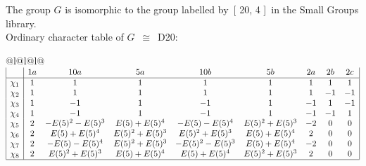 \documentclass[varwidth=\maxdimen,border=10]{standalone}
\begin{document}
The group $G$ is isomorphic to the group labelled by\ [ 20, 4 ]\ in the Small Groups library.\\
Ordinary character table of $G$\ $\cong$\ D20:\\
\begin{center}
\begin{tabular}{@{}l@{}l@{}l@{}}
\hline
\(\begin{array}{|l|cccccccc|}
  & 1a & 10a & 5a & 10b & 5b & 2a & 2b & 2c\\ \hline
\chi_{1} & 1 & 1 & 1 & 1 & 1 & 1 & 1 & 1\\
\chi_{2} & 1 & 1 & 1 & 1 & 1 & 1 & -1 & -1\\
\chi_{3} & 1 & -1 & 1 & -1 & 1 & -1 & 1 & -1\\
\chi_{4} & 1 & -1 & 1 & -1 & 1 & -1 & -1 & 1\\
\chi_{5} & 2 & -E(5)^{2}-E(5)^{3} & E(5)+E(5)^{4} & -E(5)-E(5)^{4} & E(5)^{2}+E(5)^{3} & -2 & 0 & 0\\
\chi_{6} & 2 & E(5)+E(5)^{4} & E(5)^{2}+E(5)^{3} & E(5)^{2}+E(5)^{3} & E(5)+E(5)^{4} & 2 & 0 & 0\\
\chi_{7} & 2 & -E(5)-E(5)^{4} & E(5)^{2}+E(5)^{3} & -E(5)^{2}-E(5)^{3} & E(5)+E(5)^{4} & -2 & 0 & 0\\
\chi_{8} & 2 & E(5)^{2}+E(5)^{3} & E(5)+E(5)^{4} & E(5)+E(5)^{4} & E(5)^{2}+E(5)^{3} & 2 & 0 & 0\\
\hline
\end{array}\)\\
\end{tabular}
\end{center}
\end{document}

